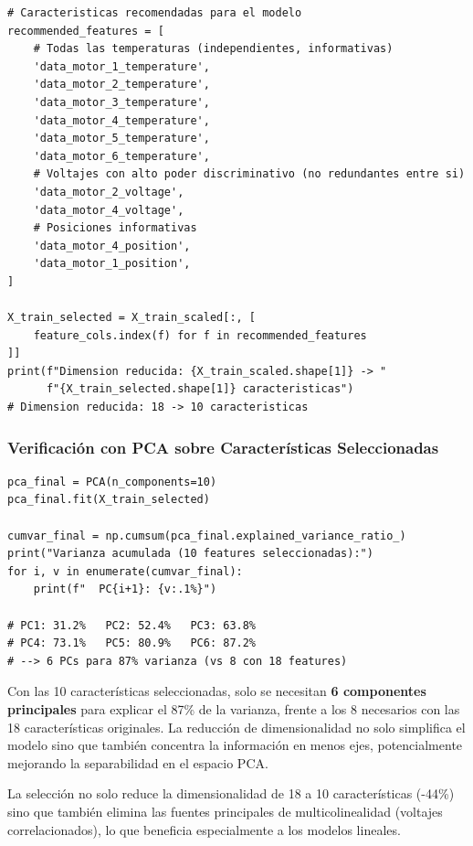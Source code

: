 \documentclass[12pt,a4paper]{article}
\begin{document}
\begin{lstlisting}[caption={Selección final de características recomendadas}, label={lst:select}]
# Caracteristicas recomendadas para el modelo
recommended_features = [
    # Todas las temperaturas (independientes, informativas)
    'data_motor_1_temperature',
    'data_motor_2_temperature',
    'data_motor_3_temperature',
    'data_motor_4_temperature',
    'data_motor_5_temperature',
    'data_motor_6_temperature',
    # Voltajes con alto poder discriminativo (no redundantes entre si)
    'data_motor_2_voltage',
    'data_motor_4_voltage',
    # Posiciones informativas
    'data_motor_4_position',
    'data_motor_1_position',
]

X_train_selected = X_train_scaled[:, [
    feature_cols.index(f) for f in recommended_features
]]
print(f"Dimension reducida: {X_train_scaled.shape[1]} -> "
      f"{X_train_selected.shape[1]} caracteristicas")
# Dimension reducida: 18 -> 10 caracteristicas
\end{lstlisting}

\subsubsection{Verificación con PCA sobre Características Seleccionadas}

\begin{lstlisting}[caption={PCA de verificación sobre las 10 características seleccionadas},
                  label={lst:pca_verify}]
pca_final = PCA(n_components=10)
pca_final.fit(X_train_selected)

cumvar_final = np.cumsum(pca_final.explained_variance_ratio_)
print("Varianza acumulada (10 features seleccionadas):")
for i, v in enumerate(cumvar_final):
    print(f"  PC{i+1}: {v:.1%}")

# PC1: 31.2%   PC2: 52.4%   PC3: 63.8%
# PC4: 73.1%   PC5: 80.9%   PC6: 87.2%
# --> 6 PCs para 87% varianza (vs 8 con 18 features)
\end{lstlisting}

\begin{resultbox}
Con las 10 características seleccionadas, solo se necesitan \textbf{6 componentes
principales} para explicar el 87\% de la varianza, frente a los 8 necesarios con
las 18 características originales. La reducción de dimensionalidad no solo simplifica
el modelo sino que también concentra la información en menos ejes, potencialmente
mejorando la separabilidad en el espacio PCA.

La selección no solo reduce la dimensionalidad de 18 a 10 características (-44\%)
sino que también elimina las fuentes principales de multicolinealidad (voltajes
correlacionados), lo que beneficia especialmente a los modelos lineales.
\end{resultbox}
\end{document}
